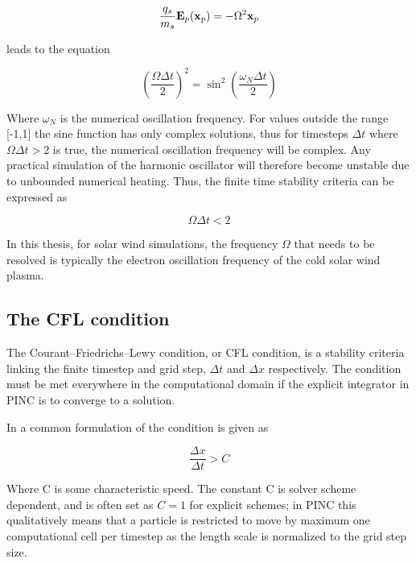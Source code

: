 \begin{equation}\label{eq:harmonicOscillator}
    \frac{q_s}{m_s} \vb{E}_p(\vb{x}_p) = - \Omega^2 \vb{x}_p
\end{equation}

leads to the equation 

\begin{equation}
    \left(\frac{\Omega \Delta t}{2} \right)^2 = \sin^2{\left(\frac{\omega_N \Delta t}{2}\right)}
\end{equation}

Where $\omega_N$ is the numerical oscillation frequency. For values outside the range [-1,1] the sine function has only complex solutions, thus for timesteps $\Delta t$ where  $\Omega \Delta t > 2$ is true, the numerical oscillation frequency will be complex. Any practical simulation of the harmonic oscillator will therefore become unstable due to unbounded numerical heating. Thus, the finite time stability criteria can be expressed as

\begin{equation}
    \Omega \Delta t < 2
\end{equation}

In this thesis, for solar wind simulations, the frequency $\Omega$ that needs to be resolved is typically the electron oscillation frequency of the cold solar wind plasma. 


\subsection{The CFL condition}
The Courant–Friedrichs–Lewy condition, or CFL condition, is a stability criteria linking the finite timestep and grid step, $\Delta t$ and $\Delta x$ respectively. The condition must be met everywhere in the computational domain if the explicit integrator in PINC is to converge to a solution.

In  a common formulation of the condition is given as

\begin{equation}
    \frac{\Delta x}{\Delta t} > C
\end{equation}

Where C is some characteristic speed. The constant C is solver scheme dependent, and is often set as $C = 1$ for explicit schemes; in PINC this qualitatively means that a particle is restricted to move by maximum one computational cell per timestep as the length scale is normalized to the grid step size.

